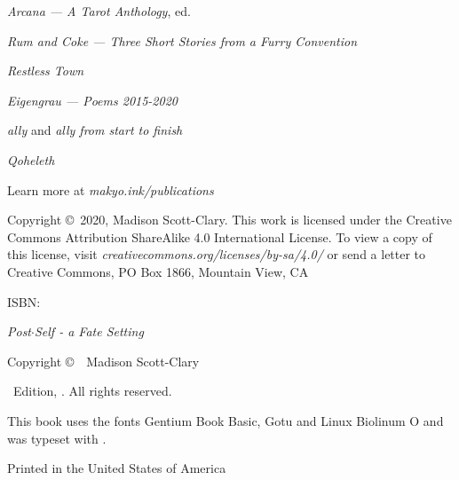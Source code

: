 \singlespacing
\thispagestyle{empty}
\null
\vfill
\begin{center}
    \TitleFamily

    \vspace{2ex}

    \emph{Arcana — A Tarot Anthology}, ed.

    \vspace{1ex}

    \emph{Rum and Coke — Three Short Stories from a Furry Convention}

    \vspace{1ex}

    \emph{Restless Town}

    \vspace{1ex}

    \emph{Eigengrau — Poems 2015-2020}

    \vspace{1ex}

    \emph{ally} and \emph{ally from start to finish}

    \vspace{1ex}

    \emph{Qoheleth}

    \vspace{2em}

    Learn more at \emph{makyo.ink/publications}
\end{center}
\vfill
\singlespacing
{\small\parindent0pt\parskip5pt
\noindent Copyright \copyright\ 2020, Madison Scott-Clary. This work is licensed under the Creative Commons Attribution ShareAlike 4.0 International License. To view a copy of this license, visit \mbox{\emph{creativecommons.org/licenses/by-sa/4.0/}} or send a letter to Creative Commons, PO Box 1866, Mountain View, CA

\vspace{1ex}

ISBN: \ISBN

\vspace{1ex}

\textit{Post$\cdot$Self - a Fate Setting}

\vspace{1ex}

Copyright \copyright\ \Year\ Madison Scott-Clary

\vspace{1ex}

\Edition\ Edition, \Year. All rights reserved.

\vspace{1ex}

This book uses the fonts Gentium Book Basic, {\DisplayFont Gotu} and {\TitleFont Linux Biolinum O} and was typeset with {\XeLaTeX}.

Printed in the United States of America\\
\EditionsList
}%

\clearpage
